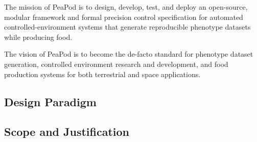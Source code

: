 \documentclass{../tex/report}
\begin{document}
\hspace{24pt} The mission of PeaPod is to design, develop, test, and deploy an open-source, modular framework and formal precision control specification for automated controlled-environment systems that generate reproducible phenotype datasets while producing food.

\hspace{24pt} The vision of PeaPod is to become the de-facto standard for phenotype dataset generation, controlled environment research and development, and food production systems for both terrestrial and space applications.

\clearpage

\subsection{Design Paradigm}
\label{sec:structure}



\clearpage
\subsection{Scope and Justification}
\label{sec:scope}
\end{document}
